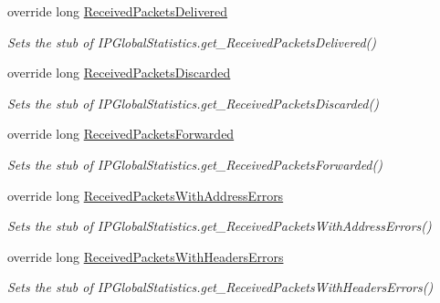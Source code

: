 \begin{DoxyCompactItemize}
override long \hyperlink{class_system_1_1_net_1_1_network_information_1_1_fakes_1_1_stub_i_p_global_statistics_aebe260139505cb1e1f83d601a35ca784}{Received\-Packets\-Delivered}
\begin{DoxyCompactList}\small\item\em Sets the stub of I\-P\-Global\-Statistics.\-get\-\_\-\-Received\-Packets\-Delivered()\end{DoxyCompactList}\item 
override long \hyperlink{class_system_1_1_net_1_1_network_information_1_1_fakes_1_1_stub_i_p_global_statistics_aa2ff9b1a150b82dc28c5f00df9e9276d}{Received\-Packets\-Discarded}
\begin{DoxyCompactList}\small\item\em Sets the stub of I\-P\-Global\-Statistics.\-get\-\_\-\-Received\-Packets\-Discarded()\end{DoxyCompactList}\item 
override long \hyperlink{class_system_1_1_net_1_1_network_information_1_1_fakes_1_1_stub_i_p_global_statistics_a5df00ed8633e42cd3ac9dff5cf8f5ae1}{Received\-Packets\-Forwarded}
\begin{DoxyCompactList}\small\item\em Sets the stub of I\-P\-Global\-Statistics.\-get\-\_\-\-Received\-Packets\-Forwarded()\end{DoxyCompactList}\item 
override long \hyperlink{class_system_1_1_net_1_1_network_information_1_1_fakes_1_1_stub_i_p_global_statistics_abd7b5d5a295ecb822ba35f08a7a106c2}{Received\-Packets\-With\-Address\-Errors}
\begin{DoxyCompactList}\small\item\em Sets the stub of I\-P\-Global\-Statistics.\-get\-\_\-\-Received\-Packets\-With\-Address\-Errors()\end{DoxyCompactList}\item 
override long \hyperlink{class_system_1_1_net_1_1_network_information_1_1_fakes_1_1_stub_i_p_global_statistics_a0c1873df8c4a750a9c0febfc1c2762c5}{Received\-Packets\-With\-Headers\-Errors}
\begin{DoxyCompactList}\small\item\em Sets the stub of I\-P\-Global\-Statistics.\-get\-\_\-\-Received\-Packets\-With\-Headers\-Errors()\end{DoxyCompactList}\item 

\end{DoxyCompactItemize}
